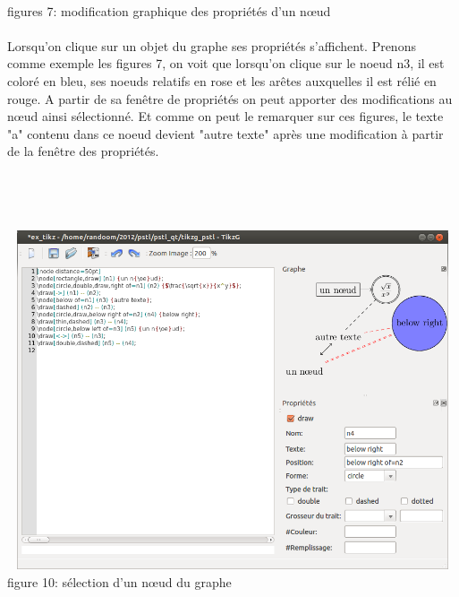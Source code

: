 \documentclass[a4paper]{report}
\begin{document}
\\ 
figures 7: modification graphique des propriétés d'un n{\oe}ud
\\
\\
Lorsqu'on clique sur un objet du graphe ses propriétés s'affichent. Prenons comme exemple les figures 7, on voit que lorsqu'on clique sur le noeud n3, il est coloré en bleu, ses noeuds relatifs en rose et les arêtes auxquelles il est rélié en rouge. A partir de sa fenêtre de propriétés on peut apporter des modifications au    n{\oe}ud ainsi sélectionné. Et comme on peut le remarquer sur ces figures, le texte "a" contenu dans ce noeud devient "autre texte" après une modification à partir de la fenêtre des propriétés.
\\
\\
\\
\\
\\
  \includegraphics[width=15cm, height=10cm]{img/r_10.png}
\\ 
figure 10: sélection d'un n{\oe}ud du graphe
\end{document}
